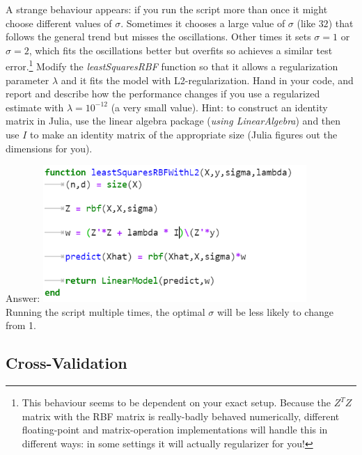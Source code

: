 \documentclass{article}
\def\ans#1{\par\gre{Answer: #1}}
\def\blu#1{{\color{blu}#1}}
\def\gre#1{{\color{gre}#1}}
\begin{document}
A strange behaviour appears: if you run the script more than once it might choose different values of $\sigma$. Sometimes it chooses a large value of $\sigma$ (like $32$) that follows the general trend but misses the oscillations. Other times it sets $\sigma = 1$ or $\sigma=2$, which fits the oscillations better but overfits so achieves a similar test error.\footnote{This behaviour seems to be dependent on your exact setup. Because the $Z^TZ$ matrix with the RBF matrix is really-badly behaved numerically, different floating-point and matrix-operation implementations will handle this in different ways: in some settings it will actually regularizer for you!} \blu{Modify the \emph{leastSquaresRBF} function so that it allows a regularization parameter $\lambda$ and it fits the model with L2-regularization. Hand in your code, and report and describe how the performance changes if you use a regularized estimate with $\lambda = 10^{-12}$ (a very small value).}
Hint: to construct an identity matrix in Julia, use the linear algebra package (\emph{using LinearAlgebra}) and then use $I$ to make an identity matrix of the appropriate size (Julia figures out the dimensions for you).
\ans{\includegraphics[width=10cm]{Q1.PNG} \\
Running the script multiple times, the optimal $\sigma$ will be less likely to change from 1.}


\subsection{Cross-Validation}
\end{document}
